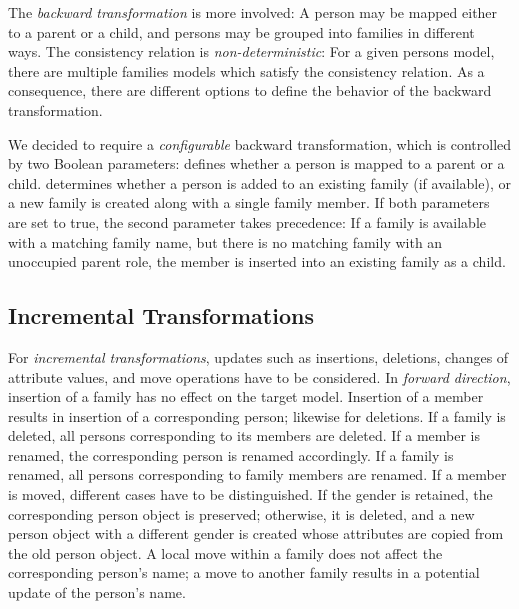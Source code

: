 The \emph{backward transformation} is more involved: A person may be mapped either to a parent or a child, and persons may be grouped into families in different ways. The consistency relation is \emph{non-deterministic}: For a given persons model, there are multiple families models which satisfy the consistency relation. As a consequence, there are different options to define the behavior of the backward transformation.

We decided to require a \emph{configurable} backward transformation, which is controlled by two Boolean parameters:  defines whether a person is mapped to a parent or a child.  determines whether a person is added to an existing family (if available), or a new family  is created along with a single family member. If both parameters are set to true, the second parameter takes precedence: If a family is available with a matching family name, but there is no matching family with an unoccupied parent role, the member is inserted into an existing family as a child.


 
\subsection{Incremental Transformations}
\label{sec:IncrementalTransformations}

For \emph{incremental transformations}, updates such as insertions, deletions, changes of attribute values, and move operations have to be considered. In \emph{forward direction}, insertion of a family has no effect on the target model. Insertion of a member results in insertion of a corresponding person; likewise for deletions. If a family is deleted, all persons corresponding to its members are deleted. If a member is renamed, the corresponding person is renamed accordingly. If a family is renamed, all persons corresponding to family members are renamed. If a member is moved, different cases have to be distinguished. If the gender is retained, the corresponding person object is preserved; otherwise, it is deleted, and a new person object with a different gender is created whose attributes are copied from the old person object. A local move within a family does not affect the corresponding person's name; a move to another family results in a potential update of the person's name. 

